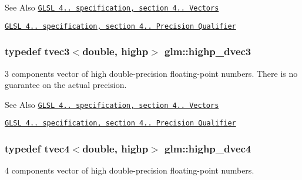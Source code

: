 \begin{DoxySeeAlso}{See Also}
\href{http://www.opengl.org/registry/doc/GLSLangSpec.4.20.8.pdf}{\tt G\-L\-S\-L 4.. specification, section 4.. Vectors} 

\href{http://www.opengl.org/registry/doc/GLSLangSpec.4.20.8.pdf}{\tt G\-L\-S\-L 4.. specification, section 4.. Precision Qualifier} 
\end{DoxySeeAlso}
\hypertarget{group__core__precision_ga54e097f7cd1f1cd46cc47eec67218bd3}{
\subsubsection[{highp\-\_\-dvec3}]{\setlength{\rightskip}{0pt plus 5cm}typedef tvec3$<$double, highp$>$ {\bf glm\-::highp\-\_\-dvec3}}}\label{group__core__precision_ga54e097f7cd1f1cd46cc47eec67218bd3}
3 components vector of high double-\/precision floating-\/point numbers. There is no guarantee on the actual precision.

\begin{DoxySeeAlso}{See Also}
\href{http://www.opengl.org/registry/doc/GLSLangSpec.4.20.8.pdf}{\tt G\-L\-S\-L 4.. specification, section 4.. Vectors} 

\href{http://www.opengl.org/registry/doc/GLSLangSpec.4.20.8.pdf}{\tt G\-L\-S\-L 4.. specification, section 4.. Precision Qualifier} 
\end{DoxySeeAlso}
\hypertarget{group__core__precision_ga2bb20b4bd180746b93577bc57f4b2b9d}{
\subsubsection[{highp\-\_\-dvec4}]{\setlength{\rightskip}{0pt plus 5cm}typedef tvec4$<$double, highp$>$ {\bf glm\-::highp\-\_\-dvec4}}}\label{group__core__precision_ga2bb20b4bd180746b93577bc57f4b2b9d}
4 components vector of high double-\/precision floating-\/point numbers.

